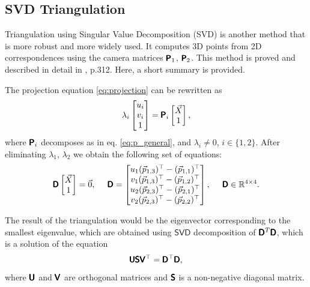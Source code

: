 \subsection{SVD Triangulation}
\label{sec:svdtriang}
Triangulation using Singular Value Decomposition (SVD) is another method that is more robust and more widely used.
It computes 3D points from 2D correspondences using the camera matrices $\pmb{\mathsf{P}}_1$, $\pmb{\mathsf{P}}_2$. 
This method is proved and described in detail in \cite{hartley_zisserman_2004}, p.312. Here, a short summary is provided.

The projection equation \eqref{eq:projection} can be rewritten as
\begin{equation}
    \lambda_i \begin{bmatrix} 
        u_i \\ v_i \\ 1 \end{bmatrix} = \pmb{\mathsf{P}}_i
    \begin{bmatrix} \vec{X} \\ 1
    \end{bmatrix},
\end{equation} 
where $\pmb{\mathsf{P}}_i$ decomposes as in eq. \eqref{eq:p_general}, and $\lambda_i \neq 0$, $i \in \{1, 2\}$.
After eliminating $\lambda_1$, $\lambda_2$ we obtain the following set of equations:
\begin{equation}
    \pmb{\mathsf{D}} \begin{bmatrix} \vec{X} \\ 1 \end{bmatrix} = \vec{0}, \;\;\;\;\;
    \pmb{\mathsf{D}} = \begin{bmatrix}
        u_1 (\vec{p}_{1, 3})^\top - (\vec{p}_{1, 1})^\top \\
        v_1 (\vec{p}_{1, 3})^\top - (\vec{p}_{1, 2})^\top \\
        u_2 (\vec{p}_{2, 3})^\top - (\vec{p}_{2, 1})^\top \\
        v_2 (\vec{p}_{2, 3})^\top - (\vec{p}_{2, 2})^\top \\
    \end{bmatrix}, \;\;\;\;\; \pmb{\mathsf{D}} \in \mathbb{R}^{4 \times 4}.
\end{equation}

The result of the triangulation would be the eigenvector corresponding to the smallest eigenvalue, which are obtained using $\mathsf{SVD}$ decomposition of $\pmb{\mathsf{D}}^T\pmb{\mathsf{D}}$, which is a solution of the equation
\begin{equation}
    \pmb{\mathsf{U}}\pmb{\mathsf{S}}\pmb{\mathsf{V}}^\top = \pmb{\mathsf{D}}^\top\pmb{\mathsf{D}},
\end{equation}
where $\pmb{\mathsf{U}}$ and $\pmb{\mathsf{V}}$ are orthogonal matrices and $\pmb{\mathsf{S}}$ is a non-negative diagonal matrix.

